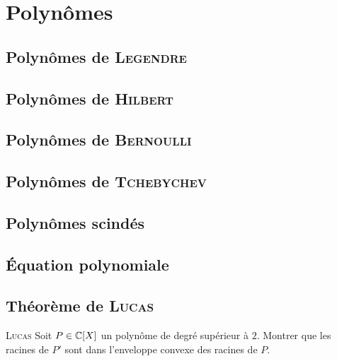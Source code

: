 \setchapterpreamble[u]{\margintoc}
\chapter{Polynômes}



\newpage

\section{Polynômes de \textsc{Legendre}} 


\section{Polynômes de \textsc{Hilbert}} 


\section{Polynômes de \textsc{Bernoulli}} 


\section{Polynômes de \textsc{Tchebychev}} 


\section{Polynômes scindés} 


\section{Équation polynomiale} 


\section{Théorème de \textsc{Lucas}}
\begin{theo}{\textsc{Lucas}}
    Soit $P \in \mathbb{C}[X]$ un polynôme de degré supérieur à $2$. Montrer que les racines de $P'$ sont dans l'enveloppe convexe des racines de $P$.
\end{theo}